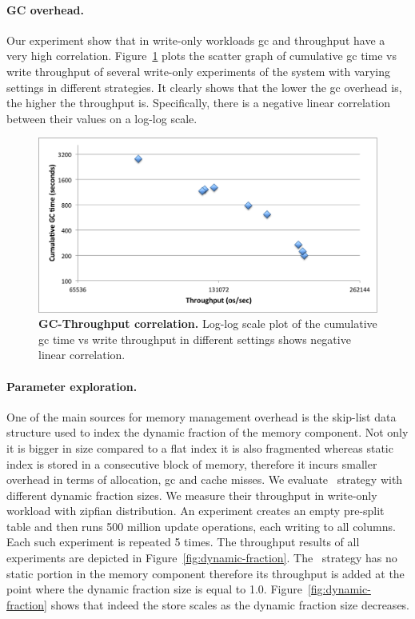 \paragraph{GC overhead.}

Our experiment show that in write-only workloads gc and throughput have a very high correlation. 
Figure~\ref{fig:gc-throughput-log2} plots the scatter graph of cumulative gc time vs write throughput of several write-only experiments of the system with varying settings in different strategies. It clearly shows that  the lower the gc overhead is, the higher the throughput is.
Specifically, there is a negative linear correlation between their values on a log-log scale.

\begin{figure}[htb]
\includegraphics[width=\figw]{Figs/gc-throughput-log2.png}
\caption{{\bf GC-Throughput correlation.} Log-log scale plot of the cumulative gc time vs write throughput in different settings shows negative linear correlation.
}
\label{fig:gc-throughput-log2}
\end{figure}

\paragraph{Parameter exploration.}
One of the main sources for memory management overhead is the skip-list data structure used to index the dynamic fraction of the memory component.
Not only it is bigger in size compared to a flat index it is also fragmented whereas static index is stored in a consecutive block of memory, therefore it incurs smaller overhead in terms of allocation, gc and cache misses.
We evaluate \basic\ strategy with different dynamic fraction sizes. We measure their throughput in write-only workload with zipfian distribution.
An experiment creates an empty pre-split table and then runs 500 million update operations, each writing to all columns. Each such experiment is repeated 5 times. 
The throughput results of all experiments are depicted in 
Figure~\ref{fig:dynamic-fraction}. 
The \none\ strategy has no static portion in the memory component therefore its throughput is added at the point where the dynamic fraction size is equal to 1.0.
Figure~\ref{fig:dynamic-fraction} shows that indeed the store scales as the dynamic fraction size decreases. 

